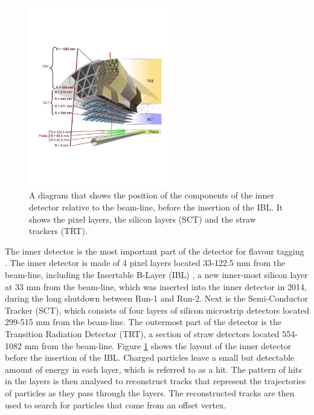 \documentclass[12pt, onecolumn,notitlepage]{article}
\begin{document}
\begin{figure}[!hbt]
  \begin{center}
    \includegraphics[width=0.55\textwidth]{Inner_Detector.pdf}
    \caption{A diagram that shows the position of the components of the inner detector relative to the beam-line, before the insertion of the IBL. 
      It shows the pixel layers, the silicon layers (SCT) and the straw trackers (TRT). }
    \label{Inner Detector}
    \end{center}
\end{figure}

The inner detector is the most important part of the detector for flavour tagging \cite{bib_ID}.
The inner detector is made of 4 pixel layers located 33-122.5 mm from the beam-line, 
including the Insertable B-Layer (IBL) \cite{bib_IBL}, a new inner-most silicon layer at 33 mm from the beam-line,
which was inserted into the inner detector in 2014, during the long shutdown between Run-1 and Run-2.
Next is the Semi-Conductor Tracker (SCT), which consists of four layers of silicon microstrip detectors located 299-515 mm from the beam-line. 
The outermost part of the detector is the Transition Radiation Detector (TRT), a section of straw detectors located 554-1082 mm from the beam-line.
Figure \ref{Inner Detector} shows the layout of the inner detector before the insertion of the IBL.
Charged particles leave a small but detectable amount of energy in each layer, which is referred to as a hit. 
The pattern of hits in the layers is then analysed to reconstruct tracks that represent the trajectories of particles as they pass through the layers.
The reconstructed tracks are then used to search for particles that come from an offset vertex. \\
\end{document}
